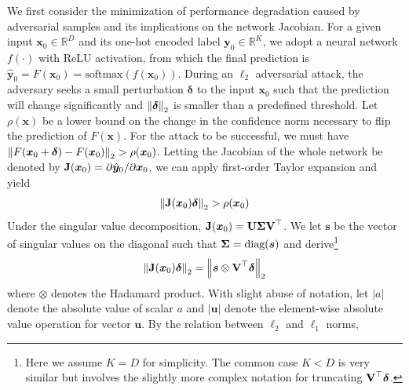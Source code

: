 We first consider the minimization of performance degradation caused by adversarial samples and its implications on the network Jacobian. 
For a given input $\bm x_0 \in \mathbb{R}^D$ and its one-hot encoded label $\bm y_0 \in \mathbb{R}^K$, we adopt a neural network $f(\cdot)$ with ReLU activation, from which the final prediction is $\hat{\bm y}_0 = F(\bm x_0) =\text{softmax}(f(\bm x_0))$. 
During an $\ell_2$ adversarial attack, the adversary seeks a small perturbation $\bm{\delta}$ to the input $\bm{x}_0$ such that the prediction will change significantly and $\left\lVert\bm{\delta}\right\rVert_2$ is smaller than a predefined threshold. 
Let $\rho(\bm{x})$ be a lower bound on the change in the confidence norm necessary to flip the prediction of $F(\bm{x})$. For the attack to be successful, we must have 
$\left\lVert F(\bm{x}_0 + \bm{\delta}) - F(\bm{x}_0)\right\rVert_2 > \rho(\bm{x}_0)$. Letting the Jacobian of the whole network be denoted by $\bm{\mathrm{J}}(\bm x_0) = \partial \hat{\bm y}_0 / \partial \bm x_0$, we can apply first-order Taylor expansion and yield 
\begin{equation}
   \left\lVert\bm{\mathrm{J}}(\bm x_0) \bm{\delta}\right\rVert_2 > \rho(\bm{x}_0)
\end{equation}
Under the singular value decomposition, $\bm{\mathrm{J}}(\bm x_0) = \bm{\mathrm{U}}\bm{\mathrm{\Sigma}}\bm{\mathrm{V}}^\top$. We let $\bm s$ be the vector of singular values on the diagonal such that $\bm{\mathrm{\Sigma}} = \text{diag}(\bm{s})$ and derive\footnote{Here we assume $K=D$ for simplicity. The common case $K<D$ is very similar but involves the slightly more complex notation for truncating $\bm{\mathrm{V}}^\top \bm{\delta}$.} 
\begin{equation}
   \left\lVert\bm{\mathrm{J}}(\bm x_0) \bm{\delta}\right\rVert_2 = \left\lVert \bm s \otimes \bm{\mathrm{V}}^\top \bm{\delta} \right\rVert_2 
\end{equation}
where $\otimes$ denotes the Hadamard product. With slight abuse of notation, let $|a|$ denote the absolute value of scalar $a$ and $|\bm u|$ denote the element-wise absolute value operation for vector $\bm u$. By the relation between $\ell_2$ and $\ell_1$ norms,
